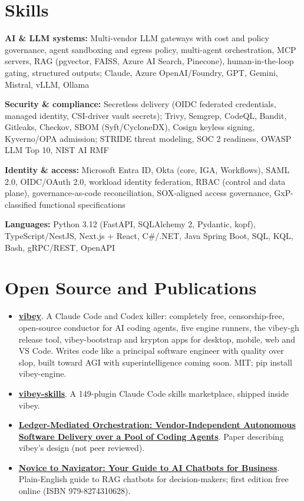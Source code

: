 \documentclass[10pt,letterpaper]{article}
\newcommand{\szmeta}{\fontsize{8pt}{10pt}\selectfont}
\begin{document}
\section*{Skills}
{\szmeta \textbf{AI \& LLM systems:} Multi-vendor LLM gateways with cost and policy governance, agent sandboxing and egress policy, multi-agent orchestration, MCP servers, RAG (pgvector, FAISS, Azure AI Search, Pinecone), human-in-the-loop gating, structured outputs; Claude, Azure OpenAI/Foundry, GPT, Gemini, Mistral, vLLM, Ollama\par\vspace{2pt}\textbf{Security \& compliance:} Secretless delivery (OIDC federated credentials, managed identity, CSI-driver vault secrets); Trivy, Semgrep, CodeQL, Bandit, Gitleaks, Checkov, SBOM (Syft/CycloneDX), Cosign keyless signing, Kyverno/OPA admission; STRIDE threat modeling, SOC 2 readiness, OWASP LLM Top 10, NIST AI RMF\par\vspace{2pt}\textbf{Identity \& access:} Microsoft Entra ID, Okta (core, IGA, Workflows), SAML 2.0, OIDC/OAuth 2.0, workload identity federation, RBAC (control and data plane), governance-as-code reconciliation, SOX-aligned access governance, GxP-classified functional specifications\par\vspace{2pt}\textbf{Languages:} Python 3.12 (FastAPI, SQLAlchemy 2, Pydantic, kopf), TypeScript/NestJS, Next.js + React, C\#/.NET, Java Spring Boot, SQL, KQL, Bash, gRPC/REST, OpenAPI}\par
\section*{Open Source and Publications}\begin{itemize}
\item \textbf{\href{https://github.com/the-vibey-project/vibey}{vibey}}. A Claude Code and Codex killer: completely free, censorship-free, open-source conductor for AI coding agents, five engine runners, the vibey-gh release tool, vibey-bootstrap and krypton apps for desktop, mobile, web and VS Code. Writes code like a principal software engineer with quality over slop, built toward AGI with superintelligence coming soon. MIT; pip install vibey-engine.
\item \textbf{\href{https://github.com/the-vibey-project/vibey}{vibey-skills}}. A 149-plugin Claude Code skills marketplace, shipped inside vibey.
\item \textbf{\href{https://the-vibey-project.github.io/vibey/main/paper.pdf}{Ledger-Mediated Orchestration: Vendor-Independent Autonomous Software Delivery over a Pool of Coding Agents}}. Paper describing vibey's design (not peer reviewed).
\item \textbf{\href{https://vibewithadam.matthewsteinberger.com/novice-to-navigator}{Novice to Navigator: Your Guide to AI Chatbots for Business}}. Plain-English guide to RAG chatbots for decision-makers; first edition free online (ISBN 979-8274310628).
\end{itemize}
\end{document}
